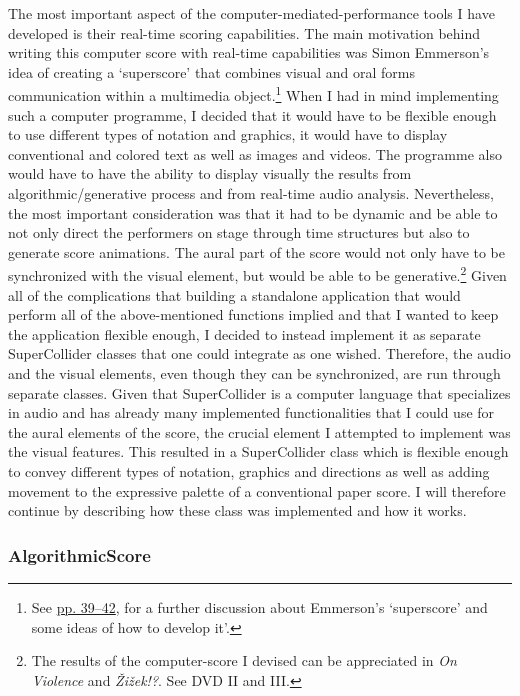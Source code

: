 The most important aspect of the computer-mediated-performance tools I have developed is their real-time scoring capabilities. The main motivation behind writing this computer score with real-time capabilities was Simon Emmerson's idea of creating a `superscore' that combines visual and oral forms communication within a multimedia object.\footnote{See \hyperlink{superscore}{pp. 39--42}, for a further discussion about Emmerson's `superscore' and some ideas of how to develop it'.} When I had in mind implementing such a computer programme, I decided that it would have to be flexible enough to use different types of notation and graphics, it would have to display conventional and colored text as well as images and videos. The programme also would have to have the ability to display visually the results from algorithmic/generative process and from real-time audio analysis. Nevertheless, the most important consideration was that it had to be dynamic and be able to not only direct the performers on stage through time structures but also to generate score animations. The aural part of the score would not only have to be synchronized with the visual element, but would be able to be generative.\footnote{The results of the computer-score I devised can be appreciated in \emph{On Violence} and \emph{\v{Z}i\v{z}ek!?}. See DVD II and III.} Given all of the complications that building a standalone application that would perform all of the above-mentioned functions implied and that I wanted to keep the application flexible enough, I decided to instead implement it as separate SuperCollider classes that one could integrate as one wished. Therefore, the audio and the visual elements, even though they can be synchronized, are run through separate classes. Given that SuperCollider is a computer language that specializes in audio and has already many implemented functionalities that I could use for the aural elements of the score, the crucial element I attempted to implement was the visual features. This resulted in a SuperCollider class which is flexible enough to convey different types of notation, graphics and directions as well as adding movement to the expressive palette of a conventional paper score. I will therefore continue by describing how these class was implemented and how it works.

\hypertarget{algoscore}{}
\subsubsection{AlgorithmicScore}

